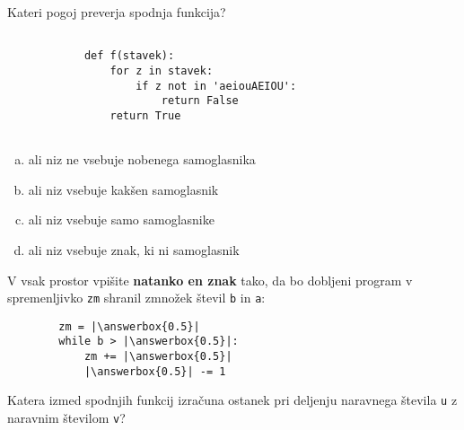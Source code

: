 \documentclass[arhiv, 10pt]{../izpit}
\newcommand{\inlinepy}[1]{\texttt{#1}}
\newcommand{\answerbox}[1]{\framebox{\vphantom{\large M}\hspace{#1cm}}}
\begin{document}
        \naloga*

        \begin{multicols}{2}
        \noindent
        Kateri pogoj preverja spodnja funkcija?
        \begin{verbatim}
        
            def f(stavek):
                for z in stavek:
                    if z not in 'aeiouAEIOU':
                        return False
                return True
            
        \end{verbatim}

        \begin{enumerate}[(a)]
\item ali niz ne vsebuje nobenega samoglasnika
\item ali niz vsebuje kakšen samoglasnik
\item ali niz vsebuje samo samoglasnike
\item ali niz vsebuje znak, ki ni samoglasnik
\end{enumerate}

        \end{multicols}
    
        \naloga*
        \begin{multicols}{2}
        \noindent
        V vsak prostor vpišite \textbf{natanko en znak} tako, da bo dobljeni program v spremenljivko \inlinepy{zm} shranil zmnožek števil \inlinepy{b} in \inlinepy{a}:
        
        \columnbreak
        \begin{verbatim}
        zm = |\answerbox{0.5}|
        while b > |\answerbox{0.5}|:
            zm += |\answerbox{0.5}|
            |\answerbox{0.5}| -= 1
        \end{verbatim}
        \end{multicols}
    
        \clearpage
        \naloga
        
        Katera izmed spodnjih funkcij izračuna ostanek pri deljenju naravnega števila \inlinepy{u} z naravnim številom \inlinepy{v}?
    
\end{document}

